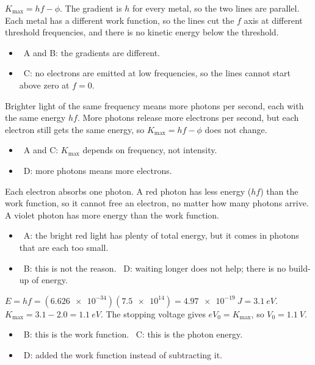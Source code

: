 \documentclass[12pt]{article}
\begin{document}
\begin{practiceanswers}
\begin{practiceans}
  $K_\mathrm{max} = hf - \phi$. The gradient is $h$ for every metal, so the two lines are parallel. Each
  metal has a different work function, so the lines cut the $f$ axis at different threshold frequencies,
  and there is no kinetic energy below the threshold.
  \begin{itemize}
    \item \xmark\ A and B: the gradients are different.
    \item \xmark\ C: no electrons are emitted at low frequencies, so the lines cannot start above zero
          at $f = 0$.
  \end{itemize}
\end{practiceans}

\begin{practiceans}
  Brighter light of the same frequency means more photons per second, each with the same energy $hf$.
  More photons release more electrons per second, but each electron still gets the same energy, so
  $K_\mathrm{max} = hf - \phi$ does not change.
  \begin{itemize}
    \item \xmark\ A and C: $K_\mathrm{max}$ depends on frequency, not intensity.
    \item \xmark\ D: more photons means more electrons.
  \end{itemize}
\end{practiceans}

\begin{practiceans}
  Each electron absorbs one photon. A red photon has less energy ($hf$) than the work function, so it
  cannot free an electron, no matter how many photons arrive. A violet photon has more energy than the
  work function.
  \begin{itemize}
    \item \xmark\ A: the bright red light has plenty of total energy, but it comes in photons that are
          each too small.
    \item \xmark\ B: this is not the reason. \quad \xmark\ D: waiting longer does not help; there is
          no build-up of energy.
  \end{itemize}
\end{practiceans}

\begin{practiceans}
  $E = hf = (\num{6.626e-34})(\num{7.5e14}) = \qty{4.97e-19}{J} = \qty{3.1}{eV}$. \quad
  $K_\mathrm{max} = 3.1 - 2.0 = \qty{1.1}{eV}$. The stopping voltage gives $eV_0 = K_\mathrm{max}$, so
  $V_0 = \qty{1.1}{V}$.
  \begin{itemize}
    \item \xmark\ B: this is the work function. \quad \xmark\ C: this is the photon energy.
    \item \xmark\ D: added the work function instead of subtracting it.
  \end{itemize}
\end{practiceans}


\end{practiceanswers}
\end{document}
